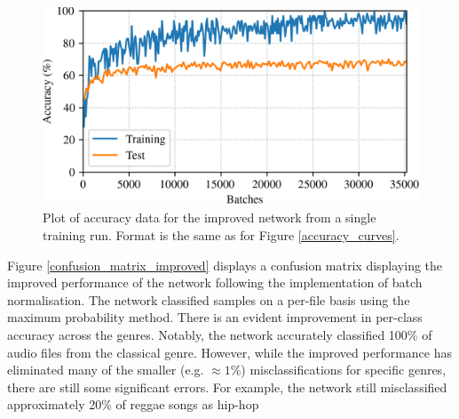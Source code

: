 \documentclass[conference]{IEEEtran}
\begin{document}
\begin{figure}[htbp]
    \centerline{\includegraphics[width=\columnwidth]{accuracy_improved.png}}
    \caption{
        Plot of accuracy data for the improved network from a single training run.
        Format is the same as for Figure \ref{accuracy_curves}.
    }
    \label{accuracy_curves_improved}
\end{figure}

Figure \ref{confusion_matrix_improved} displays a confusion matrix displaying the improved performance of the network following the implementation of batch normalisation.
The network classified samples on a per-file basis using the maximum probability method.
There is an evident improvement in per-class accuracy across the genres.
Notably, the network accurately classified 100\% of audio files from the classical genre.
However, while the improved performance has eliminated many of the smaller (e.g. $\approx 1\%$) misclassifications for specific genres, there are still some significant errors.
For example, the network still misclassified approximately 20\% of reggae songs as hip-hop
\end{document}
